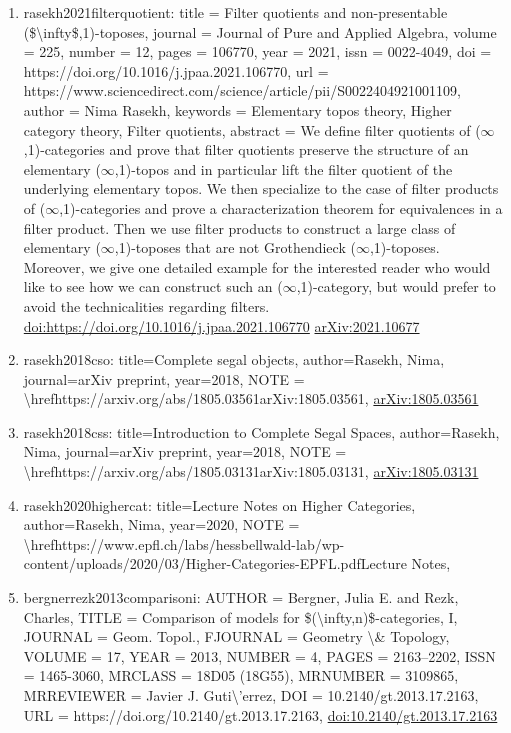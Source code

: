 \documentclass[11pt]{article}
\begin{document}
\begin{enumerate}[leftmargin=*]
  \item rasekh2021filterquotient: title = Filter quotients and non-presentable (\$\textbackslash{}infty\$,1)-toposes, journal = Journal of Pure and Applied Algebra, volume = 225, number = 12, pages = 106770, year = 2021, issn = 0022-4049, doi = https://doi.org/10.1016/j.jpaa.2021.106770, url = https://www.sciencedirect.com/science/article/pii/S0022404921001109, author = Nima Rasekh, keywords = Elementary topos theory, Higher category theory, Filter quotients, abstract = We define filter quotients of (\ensuremath{\infty},1)-categories and prove that filter quotients preserve the structure of an elementary (\ensuremath{\infty},1)-topos and in particular lift the filter quotient of the underlying elementary topos. We then specialize to the case of filter products of (\ensuremath{\infty},1)-categories and prove a characterization theorem for equivalences in a filter product. Then we use filter products to construct a large class of elementary (\ensuremath{\infty},1)-toposes that are not Grothendieck (\ensuremath{\infty},1)-toposes. Moreover, we give one detailed example for the interested reader who would like to see how we can construct such an (\ensuremath{\infty},1)-category, but would prefer to avoid the technicalities regarding filters. \href{https://doi.org/https://doi.org/10.1016/j.jpaa.2021.106770}{doi:https://doi.org/10.1016/j.jpaa.2021.106770} \href{https://arxiv.org/abs/2021.10677}{arXiv:2021.10677}
  \item rasekh2018cso: title=Complete segal objects, author=Rasekh, Nima, journal=arXiv preprint, year=2018, NOTE = \textbackslash{}hrefhttps://arxiv.org/abs/1805.03561arXiv:1805.03561, \href{https://arxiv.org/abs/1805.03561}{arXiv:1805.03561}
  \item rasekh2018css: title=Introduction to Complete Segal Spaces, author=Rasekh, Nima, journal=arXiv preprint, year=2018, NOTE = \textbackslash{}hrefhttps://arxiv.org/abs/1805.03131arXiv:1805.03131, \href{https://arxiv.org/abs/1805.03131}{arXiv:1805.03131}
  \item rasekh2020highercat: title=Lecture Notes on Higher Categories, author=Rasekh, Nima, year=2020, NOTE = \textbackslash{}hrefhttps://www.epfl.ch/labs/hessbellwald-lab/wp-content/uploads/2020/03/Higher-Categories-EPFL.pdfLecture Notes,
  \item bergnerrezk2013comparisoni: AUTHOR = Bergner, Julia E. and Rezk, Charles, TITLE = Comparison of models for \$(\textbackslash{}infty,n)\$-categories, I, JOURNAL = Geom. Topol., FJOURNAL = Geometry \textbackslash{}\& Topology, VOLUME = 17, YEAR = 2013, NUMBER = 4, PAGES = 2163--2202, ISSN = 1465-3060, MRCLASS = 18D05 (18G55), MRNUMBER = 3109865, MRREVIEWER = Javier J. Guti\textbackslash{}'errez, DOI = 10.2140/gt.2013.17.2163, URL = https://doi.org/10.2140/gt.2013.17.2163, \href{https://doi.org/10.2140/gt.2013.17.2163}{doi:10.2140/gt.2013.17.2163}

\end{enumerate}
\end{document}
